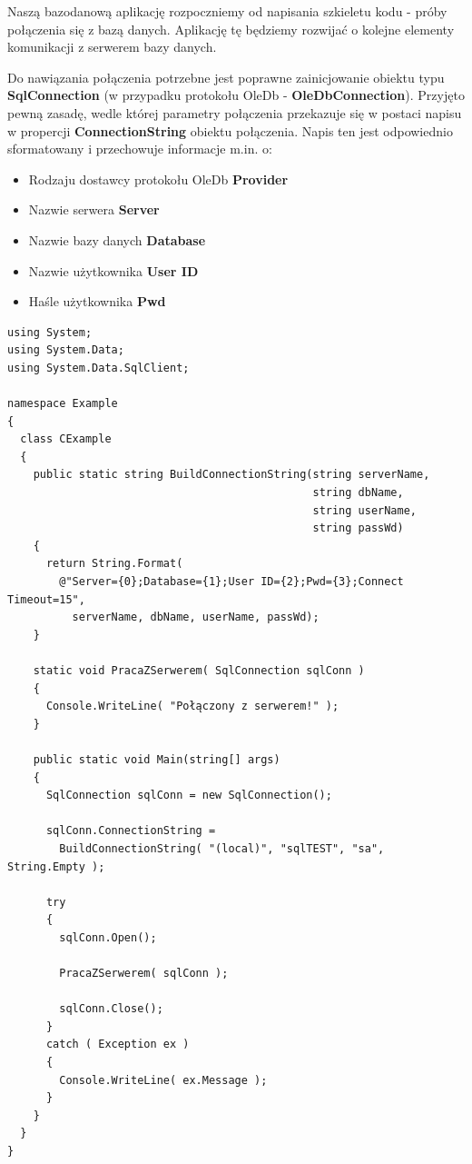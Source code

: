 Naszą bazodanową aplikację rozpoczniemy od napisania szkieletu kodu - próby połączenia się z bazą danych. 
Aplikację tę będziemy rozwijać o kolejne elementy komunikacji z serwerem bazy danych. 

Do nawiązania połączenia
potrzebne jest poprawne zainicjowanie obiektu typu {\bf SqlConnection} (w przypadku protokołu OleDb - 
{\bf OleDbConnection}). Przyjęto pewną zasadę, wedle której parametry połączenia przekazuje się
w postaci napisu w propercji {\bf ConnectionString} obiektu połączenia. Napis ten jest odpowiednio
sformatowany i przechowuje informacje m.in. o:
\begin{itemize}
\item Rodzaju dostawcy protokołu OleDb {\bf Provider} 
\item Nazwie serwera {\bf Server}
\item Nazwie bazy danych {\bf Database}
\item Nazwie użytkownika {\bf User ID}
\item Haśle użytkownika {\bf Pwd}
\end{itemize}

\begin{scriptsize}
\begin{verbatim}
using System;
using System.Data;
using System.Data.SqlClient;

namespace Example
{	  
  class CExample
  {  	
    public static string BuildConnectionString(string serverName, 
                                               string dbName, 
                                               string userName, 
                                               string passWd)
    {
      return String.Format(  
        @"Server={0};Database={1};User ID={2};Pwd={3};Connect Timeout=15", 
          serverName, dbName, userName, passWd);
    }

    static void PracaZSerwerem( SqlConnection sqlConn )
    {
      Console.WriteLine( "Połączony z serwerem!" );
    }

    public static void Main(string[] args)
    {
      SqlConnection sqlConn = new SqlConnection();
      	
      sqlConn.ConnectionString = 
        BuildConnectionString( "(local)", "sqlTEST", "sa", String.Empty );

      try
      {
        sqlConn.Open();
        
        PracaZSerwerem( sqlConn );
	        
        sqlConn.Close();
      }
      catch ( Exception ex )
      {
        Console.WriteLine( ex.Message ); 
      }
    }
  }
}
\end{verbatim}
\end{scriptsize}

